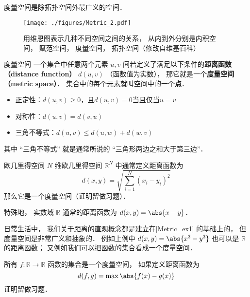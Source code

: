 

度量空间是除拓扑空间外最广义的空间．
\begin{figure}[ht]
\centering
\texttt{[image: ./figures/Metric\_2.pdf]}
\caption{用维恩图表示几种不同空间之间的关系， 从内到外分别是内积空间， 赋范空间， 度量空间， 拓扑空间（修改自维基百科）} \label{Metric_fig2}
\end{figure}

\begin{definition}{度量空间}
一个集合中任意两个元素 $u, v$ 间若定义了满足以下条件的\textbf{距离函数（distance function）} $d(u, v)$ （函数值为实数）， 那它就是一个\textbf{度量空间（metric space）}． 集合中的每个元素就叫空间中的一个\textbf{点}．
\begin{itemize}
\item 正定性：$d(u, v) \geq 0$，且$d(u, v)=0$当且仅当$u=v$
\item 对称性：$d(u, v) = d(v, u)$
\item 三角不等式：$d(u, v) \leqslant d(u, w) + d(w, v)$
\end{itemize}
\end{definition}
其中 “三角不等式” 就是通常所说的 “三角形两边之和大于第三边”． 

\begin{example}{欧几里得空间}\label{Metric_ex1}
$N$ 维欧几里得空间 $\mathbb R^N$ 中通常定义距离函数为
\begin{equation}
d(x, y) = \sqrt{\sum_{i=1}^N (x_i - y_i)^2}
\end{equation}
那么它是一个度量空间（证明留做习题）．

特殊地， 实数域 $\mathbb R$ 通常的距离函数为 $d(x, y) = \abs{x - y}$．
\end{example}

日常生活中， 我们关于距离的直观概念都是建立在\autoref{Metric_ex1} 的基础上的， 但度量空间是非常广义和抽象的． 例如上例中 $d(x, y) = \abs{x^3 - y^3}$ 也可以是 $\mathbb R$ 的距离函数； 又例如我们可以把函数的集合看成一个度量空间．
\begin{example}{}
所有 $f:\mathbb R \to \mathbb R$ 函数的集合是一个度量空间， 如果定义距离函数为
\begin{equation}
d(f, g) = \max{\abs{f(x) - g(x)}}
\end{equation}
证明留做习题．
\end{example}

